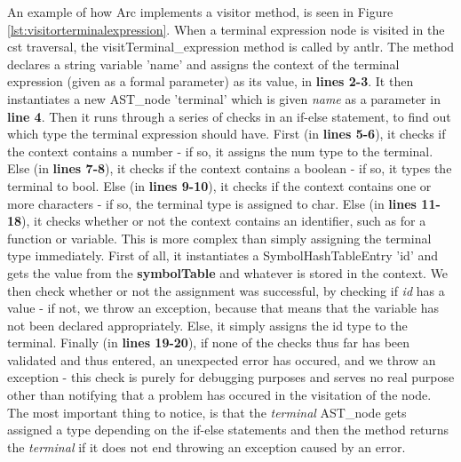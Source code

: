 An example of how Arc implements a visitor method, is seen in Figure \ref{lst:visitorterminalexpression}. When a terminal expression node is visited in the \gls{cst} traversal, the visitTerminal\_expression method is called by \gls{antlr}. The method declares a string variable 'name' and assigns the context of the terminal expression (given as a formal parameter) as its value, in \textbf{lines 2-3}. It then instantiates a new AST\_node 'terminal' which is given \textit{name} as a parameter in \textbf{line 4}. Then it runs through a series of checks in an if-else statement, to find out which type the terminal expression should have. First (in \textbf{lines 5-6}), it checks if the context contains a number - if so, it assigns the num type to the terminal. Else (in \textbf{lines 7-8}), it checks if the context contains a boolean - if so, it types the terminal to bool. Else (in \textbf{lines 9-10}), it checks if the context contains one or more characters - if so, the terminal type is assigned to char. Else (in \textbf{lines 11-18}), it checks whether or not the context contains an identifier, such as for a function or variable. This is more complex than simply assigning the terminal type immediately. First of all, it instantiates a SymbolHashTableEntry 'id' and gets the value from the \textbf{symbolTable} and whatever is stored in the context. We then check whether or not the assignment was successful, by checking if \textit{id} has a value - if not, we throw an exception, because that means that the variable has not been declared appropriately. Else, it simply assigns the id type to the terminal. Finally (in \textbf{lines 19-20}), if none of the checks thus far has been validated and thus entered, an unexpected error has occured, and we throw an exception - this check is purely for debugging purposes and serves no real purpose other than notifying that a problem has occured in the visitation of the node. The most important thing to notice, is that the \textit{terminal} AST\_node gets assigned a type depending on the if-else statements and then the method returns the \textit{terminal} if it does not end throwing an exception caused by an error.

